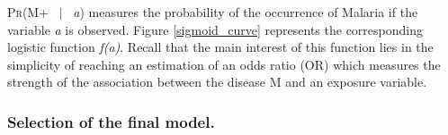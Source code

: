 \textsc{Pr}(\textsc{M+} ~$|$~ \emph{a}) measures the probability of the occurrence of Malaria if the variable \emph{a} is observed.
Figure \ref{sigmoid_curve} represents the corresponding logistic function \emph{f(a)}. Recall that the main interest of this function
lies in the simplicity of reaching an estimation of an odds ratio (OR) which measures the strength of the association between the 
disease \textsc{M} and an exposure variable.

\subsubsection{Selection of the final model.}  
